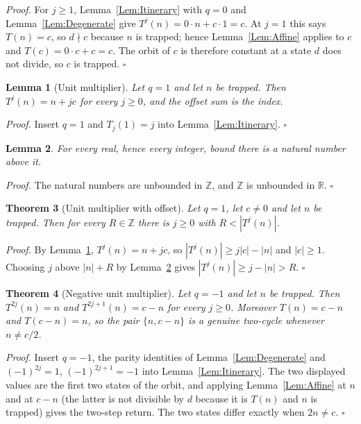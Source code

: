 \documentclass[11pt,letterpaper]{article}
\newcommand{\Z}{\mathbb{Z}}
\newcommand{\R}{\mathbb{R}}
\newtheorem{theorem}{Theorem}
\newtheorem{lemma}[theorem]{Lemma}
\newenvironment{proof}{\noindent\textit{Proof.}}{\hfill\(\square\)}
\begin{document}
\begin{proof}
For \(j\ge1\), Lemma~\ref{Lem:Itinerary} with \(q=0\) and
Lemma~\ref{Lem:Degenerate} give \(T^{j}(n)=0\cdot n+c\cdot1=c\). At \(j=1\)
this says \(T(n)=c\), so \(d\nmid c\) because \(n\) is trapped; hence
Lemma~\ref{Lem:Affine} applies to \(c\) and \(T(c)=0\cdot c+c=c\). The
orbit of \(c\) is therefore constant at a state \(d\) does not divide, so
\(c\) is trapped.
\end{proof}

\begin{lemma}[Unit multiplier]\label{Lem:OneTranslation}
Let \(q=1\) and let \(n\) be trapped. Then \(T^{j}(n)=n+jc\) for every
\(j\ge0\), and the offset sum is the index.
\end{lemma}

\begin{proof}
Insert \(q=1\) and \(T_{j}(1)=j\) into Lemma~\ref{Lem:Itinerary}.
\end{proof}

\begin{lemma}\label{Lem:Archimedean}
For every real, hence every integer, bound there is a natural number above it.
\end{lemma}

\begin{proof}
The natural numbers are unbounded in \(\Z\), and \(\Z\) is unbounded in
\(\R\).
\end{proof}

\begin{theorem}[Unit multiplier with offset]\label{Thm:OneUnbounded}
Let \(q=1\), let \(c\ne0\) and let \(n\) be trapped. Then for every \(R\in\Z\)
there is \(j\ge0\) with \(R<|T^{j}(n)|\).
\end{theorem}

\begin{proof}
By Lemma~\ref{Lem:OneTranslation}, \(T^{j}(n)=n+jc\), so
\(|T^{j}(n)|\ge j|c|-|n|\) and \(|c|\ge1\). Choosing \(j\) above
\(|n|+R\) by Lemma~\ref{Lem:Archimedean} gives
\(|T^{j}(n)|\ge j-|n|>R\).
\end{proof}

\begin{theorem}[Negative unit multiplier]\label{Thm:NegOne}
Let \(q=-1\) and let \(n\) be trapped. Then \(T^{2j}(n)=n\) and
\(T^{2j+1}(n)=c-n\) for every \(j\ge0\). Moreover \(T(n)=c-n\) and
\(T(c-n)=n\), so the pair \(\{n,c-n\}\) is a genuine two-cycle whenever
\(n\ne c/2\).
\end{theorem}

\begin{proof}
Insert \(q=-1\), the parity identities of Lemma~\ref{Lem:Degenerate} and
\((-1)^{2j}=1\), \((-1)^{2j+1}=-1\) into Lemma~\ref{Lem:Itinerary}. The two
displayed values are the first two states of the orbit, and applying
Lemma~\ref{Lem:Affine} at \(n\) and at \(c-n\) (the latter is not divisible by
\(d\) because it is \(T(n)\) and \(n\) is trapped) gives the two-step return.
The two states differ exactly when \(2n\ne c\).
\end{proof}
\end{document}
